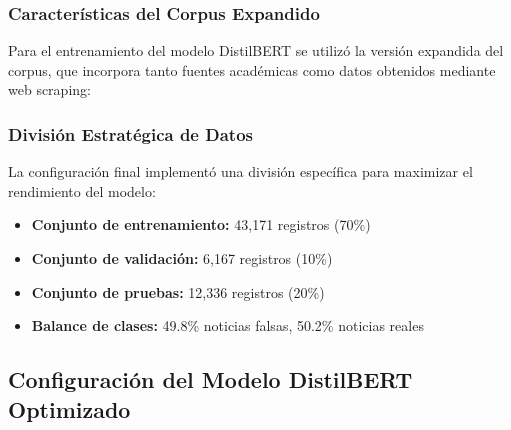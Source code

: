 \subsubsection{Características del Corpus Expandido}

Para el entrenamiento del modelo DistilBERT se utilizó la versión expandida del corpus, que incorpora tanto fuentes académicas como datos obtenidos mediante web scraping:

\begin{table}[htbp]
\centering
{}
\caption{Composición del corpus expandido utilizado para el entrenamiento de DistilBERT.}
\label{tab:corpus_expandido_distilbert}
\end{table}

\subsubsection{División Estratégica de Datos}

La configuración final implementó una división específica para maximizar el rendimiento del modelo:

\begin{itemize}
    \item \textbf{Conjunto de entrenamiento:} 43,171 registros (70\%)
    \item \textbf{Conjunto de validación:} 6,167 registros (10\%)
    \item \textbf{Conjunto de pruebas:} 12,336 registros (20\%)
    \item \textbf{Balance de clases:} 49.8\% noticias falsas, 50.2\% noticias reales
\end{itemize}

\subsection{Configuración del Modelo DistilBERT Optimizado}
\label{subsec:configuracion_distilbert}

